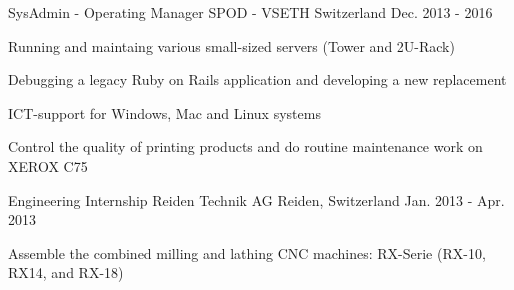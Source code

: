 

\begin{cventries}

  \cventry
    {SysAdmin - Operating Manager} %
    {SPOD - VSETH} %
    {Switzerland} %
    {Dec. 2013 - 2016} %
    {
      \begin{cvitems} %
        \item {Running and maintaing various small-sized servers (Tower and 2U-Rack)}
        \item {Debugging a legacy Ruby on Rails application and developing a new replacement}
        \item {ICT-support for Windows, Mac and Linux systems}
        \item {Control the quality of printing products and do routine maintenance work on XEROX C75}
      \end{cvitems}
    }

  \cventry
    {Engineering Internship} %
    {Reiden Technik AG} %
    {Reiden, Switzerland} %
    {Jan. 2013 - Apr. 2013} %
    {
      \begin{cvitems} %
        \item {Assemble the combined milling and lathing CNC machines: RX-Serie (RX-10, RX14, and RX-18)}
      \end{cvitems}
    }


\end{cventries}
